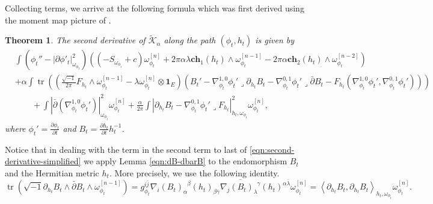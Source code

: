 \documentclass[10pt, letterpaper]{amsart}
\newcommand{\tr}{\operatorname{tr}}
\theoremstyle{plain}
\newtheorem{theorem}{Theorem}[section]
\theoremstyle{definition}
\numberwithin{equation}{section}
\begin{document}
Collecting terms, we arrive at the following formula which was first derived using the moment map picture of \cite{Garcia1}. 
\begin{theorem}\label{thm:second-variation}
		The second derivative of $\widetilde{\mathcal{K}}_\alpha$ along the path $\left(\phi_t, h_t\right)$ is given by
	\begin{equation}
	\begin{split}
	& \int \left(\phi_t''-\left|\partial \phi'_t\right|_{\omega_{\phi_t}}^2\right) \left(
	\left( -S_{\omega_{\phi_t}} +c\right)\omega_{\phi_t}^{[n]} 
	+ 
	2\pi\alpha\lambda \mathbf{ch}_1\left(h_t\right)\wedge\omega_{\phi_t}^{[n-1]}
 -
 2\pi \alpha \mathbf{ch}_2\left(h_t\right)\wedge \omega_{\phi_t}^{[n-2]}
	\right)\\
	& + 
	\alpha \int \tr \left(\left( \frac{\sqrt{-1}}{2\pi}F_{h_t}\wedge \omega_{\phi_t}^{[n-1]} - \lambda \omega_{\phi_t}^{[n]}\otimes \mathbf{1}_E\right) \left(B_t'
    -\nabla_{\phi_t}^{1,0}\phi_t'\lrcorner \partial_{h_t} B_t 
    -\nabla_{\phi_t}^{0,1}\phi_t'\lrcorner \bar\partial B_t
    - 
	F_{h_t}\left(\nabla_{\phi_t}^{1,0}\phi_t', \nabla_{\phi_t}^{0,1}\phi_t'\right)\right)
	\right)\\
	&\qquad + 
	\int \left|\bar\partial\left(\nabla_{\phi_t}^{1,0}\phi_t'\right)\right|_{\omega_{\phi_t}}^2\omega_{\phi_t}^{[n]} 
	+
	\frac{\alpha}{2\pi}\int\left| \partial_{h_t} B_t-\nabla_{\phi_t}^{0,1}\phi_t'\lrcorner F_{h_t}\right|_{h_t,\omega_{\phi_t}}^2\omega_{\phi_t}^{[n]},
	\end{split}
	\end{equation}
    where $\phi_t'=\frac{\partial \phi_t}{\partial t}$ and $B_t=\frac{\partial h_t}{\partial t}h_t^{-1}$.
\end{theorem}
Notice that in dealing with the term in the second term to last of \eqref{eqn:second-derivative-simplified} we apply Lemma \ref{eqn:dB-dbarB} to the endomorphism $B_t$ and the Hermitian metric $h_t$. More precisely, we use the following identity. 
\[
\tr \left(\sqrt{-1}\partial_{h_t} B_t\wedge \bar\partial B_t\wedge \omega_{\phi_t}^{[n-1]} \right)
=
g_{\phi_t}^{i\bar j}\nabla_i \left(B_t\right)_\alpha^{\phantom{\alpha}\beta} \left(h_t\right)_{\beta\bar\gamma}
\overline{\nabla_j \left(B_t\right)_\lambda^{\phantom{\lambda}\gamma}}\left(h_t\right)^{\alpha\bar\lambda}\omega_{\phi_t}^{[n]}
= 
\left\langle\partial_{h_t} B_t, \partial_{h_t} B_t\right\rangle_{h_t,\omega_{\phi_t}} \omega_{\phi_t}^{[n]}.
\]
\end{document}
